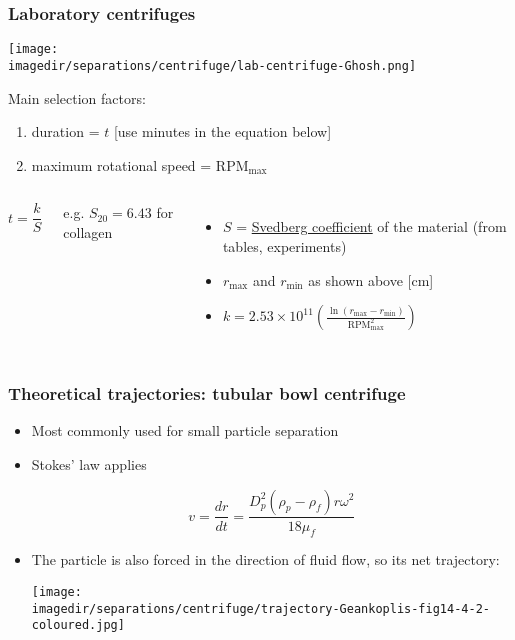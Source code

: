 \begin{frame}\frametitle{Laboratory centrifuges}
	
	\begin{center}
		\texttt{[image: \\imagedir/separations/centrifuge/lab-centrifuge-Ghosh.png]}
	\end{center}
	\vspace{-12pt}
	Main selection factors:
	\begin{enumerate}
		\item	duration = $t$ [use minutes in the equation below]
		\item	maximum rotational speed = $\text{RPM}_\text{max}$
	\end{enumerate}
	\vspace{-12pt}
	\begin{columns}[t]
			\[
				t = \displaystyle \frac{k}{S}
			\]
			
			\vspace{24pt}
			{\small e.g. $S_{20} = 6.43$ for collagen}
			\begin{itemize}
				\item	$S$ = \href{http://en.wikipedia.org/wiki/Svedberg}{Svedberg coefficient} of the material (from tables, experiments) 
				\item	$r_\text{max}$ and $r_\text{min}$ as shown above [cm]
				\item	$k = 2.53 \times 10^{11} \left(\displaystyle \frac{\ln\left( r_\text{max} -r_\text{min} \right)}{\text{RPM}_\text{max}^2} \right)$
			\end{itemize}
	\end{columns}	
\end{frame}

\begin{frame}\frametitle{Theoretical trajectories: tubular bowl centrifuge}
	\begin{itemize}
		\item	Most commonly used for small particle separation
		\item	Stokes' law applies
			\begin{exampleblock}{}
				\[	
					v = \frac{dr}{dt} = \frac{D_p^2\left(\rho_p - \rho_f\right)r\omega^2}{18 \mu_f}
				\]				
			\end{exampleblock}
			
		\item	The particle is also forced in the direction of fluid flow, so its net trajectory:
		\begin{center}
			\texttt{[image: \\imagedir/separations/centrifuge/trajectory-Geankoplis-fig14-4-2-coloured.jpg]}
		\end{center}
	\end{itemize}
\end{frame}

